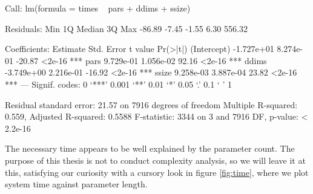 \begin{Schunk}
\begin{Soutput}
Call:
lm(formula = times ~ pars + ddims + ssize)

Residuals:
   Min     1Q Median     3Q    Max 
-86.89  -7.45  -1.55   6.30 556.32 

Coefficients:
              Estimate Std. Error t value Pr(>|t|)    
(Intercept) -1.727e+01  8.274e-01  -20.87   <2e-16 ***
pars         9.729e-01  1.056e-02   92.16   <2e-16 ***
ddims       -3.749e+00  2.216e-01  -16.92   <2e-16 ***
ssize        9.258e-03  3.887e-04   23.82   <2e-16 ***
---
Signif. codes:  0 ‘***’ 0.001 ‘**’ 0.01 ‘*’ 0.05 ‘.’ 0.1 ‘ ’ 1

Residual standard error: 21.57 on 7916 degrees of freedom
Multiple R-squared:  0.559,	Adjusted R-squared:  0.5588 
F-statistic:  3344 on 3 and 7916 DF,  p-value: < 2.2e-16
\end{Soutput}
\end{Schunk}

The necessary time appears to be well explained by the parameter count.
The purpose of this thesis is not to conduct complexity analysis, so we will
leave it at this, satisfying our curiosity with a cursory look in figure 
\ref{fig:time}, where we plot system time against parameter length.

